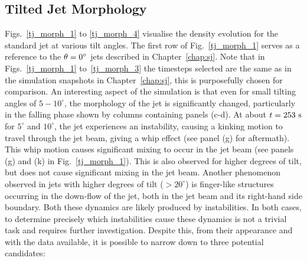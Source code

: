 \subsection{Tilted Jet Morphology}
\label{subsec:steady}
Figs.~\ref{tj_morph_1} to \ref{tj_morph_4} visualise the density evolution for the standard jet at various tilt angles. The first row of Fig.~\ref{tj_morph_1} serves as a reference to the $\theta=0^{\circ}$ jets described in Chapter~\ref{chap:sj}. Note that in Figs.~\ref{tj_morph_1} to~\ref{tj_morph_3} the timesteps selected are the same as in the simulation snapshots in Chapter~\ref{chap:sj}, this is purposefully chosen for comparison. \np
%
An interesting aspect of the simulation is that even for small tilting angles of $5-10^{\circ}$, the morphology of the jet is significantly changed, particularly in the falling phase shown by columns containing panels (c-d). At about $t=253~\rm{s}$ for $5^{\circ}$ and $10^{\circ}$, the jet experiences an instability, causing a kinking motion to travel through the jet beam, giving a whip effect (see panel (g) for aftermath). This whip motion causes significant mixing to occur in the jet beam (see panels (g) and (k) in Fig.~\ref{tj_morph_1}). This is also observed for higher degrees of tilt, but does not cause significant mixing in the jet beam. Another phenomenon observed in jets with higher degrees of tilt ($>20^{\circ}$) is finger-like structures occurring in the down-flow of the jet, both in the jet beam and its right-hand side boundary. Both these dynamics are likely produced by instabilities. In both cases, to determine precisely which instabilities cause these dynamics is not a trivial task and requires further investigation. Despite this, from their appearance and with the data available, it is possible to narrow down to three potential candidates:

